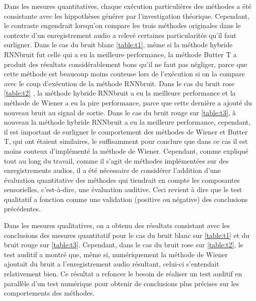 \documentclass[conference,onecolumn]{IEEEtran}
\begin{document}
Dans les mesures quantitatives, chaque exécution particulières des méthodes a été consistante avec les hippothèses générer par l’investigation théorique. Cependant, le contraste engendrait lorsqu’on compare les trois méthodes originales dans le contexte d’un enregistrement audio a relevé certaines particularités qu’il faut surligner. Dans le cas du bruit blanc \ref{table:t1}, même si la méthode hybride RNNbruit fut celle qui a eu la meilleure performance, la méthode Butter T a produit des résultats considérablement bons qu’il ne faut pas négliger, parce que cette méthode est beaucoup moins couteuse lors de l’exécution si on la compare avec le coup d’exécution de la méthode RNNbruit. Dans le cas du bruit rose \ref{table:t2} , la méthode hybride RNNbruit a eu la meilleure performance et la méthode de Wiener a eu la pire performance, parce que cette dernière a ajouté du nouveau bruit au signal de sortie. Dans le cas du bruit rouge sur \ref{table:t3}, à nouveau la méthode hybride RNNbruit a eu la meilleure performance, cependant, il est important de surligner le comportement des méthodes de Wiener et Butter T, qui ont étaient similaires, le suffisamment pour conclure que dans ce cas il est moins couteux d’implémenté la méthode de Wiener. Cependant, comme expliqué tout au long du travail, comme il s’agit de méthodes implémentées sur des enregistrements audios, il a été nécessaire de considérer l’addition d’une évaluation quantitative des méthodes qui tiendrait en compte les composantes sensorielles, c’est-à-dire, une évaluation auditive. Ceci revient à dire que le test qualitatif a fonction comme une validation (positive ou négative) des conclusions précédentes. 

Dans les mesures qualitatives, on a obtenu des résultats consistant avec les conclusions des mesures quantitatif pour le cas du bruit blanc sur \ref{table:t1} et du bruit rouge sur \ref{table:t3}. Cependant, dans le cas du bruit rose sur \ref{table:t2}, le test auditif a montré que, même si, numériquement la méthode de Wiener ajoutait du bruit a l’enregistrement audio résultant, celui-ci s’entendait relativement bien. Ce résultat a refoncer le besoin de réaliser un test auditif en parallèle d’un test numérique pour obtenir de conclusions plus précises sur les comportements des méthodes. 

\medskip
\end{document}
